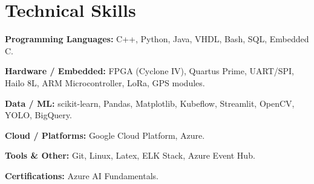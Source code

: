 \documentclass[a4paper,11pt]{article}
\begin{document}
\section{\textbf{Technical Skills}}
  \begin{itemize}[leftmargin=0.05in,label={}]
    \small{
      \item{\textbf{Programming Languages:} C++, Python, Java, VHDL, Bash, SQL, Embedded C.}
      \vspace{-2mm}
      \item{\textbf{Hardware / Embedded:} FPGA (Cyclone IV), Quartus Prime, UART/SPI, Hailo 8L, ARM Microcontroller, LoRa, GPS modules.}
      \vspace{-2mm}
      \item{\textbf{Data / ML:} scikit-learn, Pandas, Matplotlib, Kubeflow, Streamlit, OpenCV, YOLO, BigQuery.}
      \vspace{-2mm}
      \item{\textbf{Cloud / Platforms:} Google Cloud Platform, Azure.}
      \vspace{-2mm}
  \item{\textbf{Tools \& Other:} Git, Linux, Latex, ELK Stack, Azure Event Hub.}
      \vspace{-2mm}
      \item{\textbf{Certifications:} Azure AI Fundamentals.}
    }
  \end{itemize}
\end{document}
